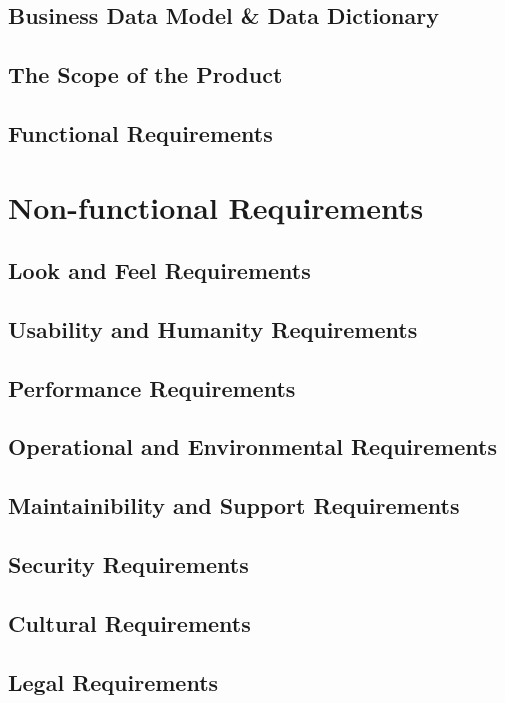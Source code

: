 \documentclass[12pt]{article}
\begin{document}
\subsection{Business Data Model \& Data Dictionary} %
\subsection{The Scope of the Product} %
\subsection{Functional Requirements} %

\section{Non-functional Requirements}
\subsection{Look and Feel Requirements} %
\subsection{Usability and Humanity Requirements} %
\subsection{Performance Requirements} %
\subsection{Operational and Environmental Requirements} %
\subsection{Maintainibility and Support Requirements} %
\subsection{Security Requirements} %
\subsection{Cultural Requirements} %
\subsection{Legal Requirements} %
\end{document}
